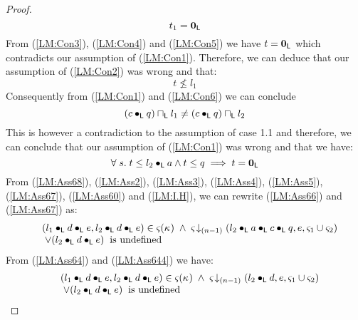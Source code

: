 \begin{lemma}[]
\begin{proof}
\begin{equation}
	t_1 = \mathbf{0}_{\textsf{L}} \label{LM:Con5}
\end{equation}
% 
From (\ref{LM:Con3}), (\ref{LM:Con4}) and (\ref{LM:Con5}) we have $t = \mathbf{0}_{\textsf{L}}$ which contradicts our assumption of (\ref{LM:Con1}). Therefore, we can deduce that our assumption of (\ref{LM:Con2}) was wrong and that:
%
\begin{equation}
	t \not\leq l_1 \label{LM:Con6}
\end{equation}
%
Consequently from (\ref{LM:Con1}) and (\ref{LM:Con6}) we can conclude
%
\begin{equation}
	(c \bullet_{\textsf{L}} q) \sqcap_{\textsf{L}} l_1 \not= (c \bullet_{\textsf{L}} q) \sqcap_{\textsf{L}} l_2 \nonumber
\end{equation}
%
This is however a contradiction to the assumption of case 1.1 and therefore, we can conclude that our assumption of (\ref{LM:Con1}) was wrong and that we have:
%
\begin{equation}
	\forall\; s.\; t\leq l_2 \bullet_{\textsf{L}} a \land t \leq  q \implies t = \mathbf{0}_{\textsf{L}} \label{LM:Ass60}
\end{equation}
%
From (\ref{LM:Ass68}), (\ref{LM:Ass2}), (\ref{LM:Ass3}), (\ref{LM:Ass4}), (\ref{LM:Ass5}), (\ref{LM:Ass67}), (\ref{LM:Ass60}) and (\ref{LM:I.H}), we can rewrite (\ref{LM:Ass66}) and (\ref{LM:Ass67}) as:
%
\begin{align}
	\begin{array}{l l}
		& (l_1 \bullet_{\textsf{L}} d \bullet_{\textsf{L}} e, l_2 \bullet_{\textsf{L}} d \bullet_{\textsf{L}} e) \in \varsigma_{}(\kappa_{}) \;\land\;
		\varsigma_{} \!\downarrow_{(n-1)} \left(l_2 \bullet_{\textsf{L}} a \bullet_{\textsf{L}} c \bullet_{\textsf{L}} q, e, \varsigma_{1} \cup \varsigma_{2}\right)\\
		& \;\lor (l_2 \bullet_{\textsf{L}} d \bullet_{\textsf{L}} e)\hspace*{0.2cm}\text{is undefined}
	\end{array} \label{LM:Ass69}
\end{align}
From (\ref{LM:Ass64}) and (\ref{LM:Ass644}) we have: 
%
\begin{align}
	\begin{array}{l l}
		& (l_1 \bullet_{\textsf{L}} d \bullet_{\textsf{L}} e, l_2 \bullet_{\textsf{L}} d \bullet_{\textsf{L}} e) \in \varsigma_{}(\kappa_{}) \;\land\;
		\varsigma_{} \!\downarrow_{(n-1)} \left(l_2 \bullet_{\textsf{L}} d, e, \varsigma_{1} \cup \varsigma_{2}\right)\\
		& \;\lor (l_2 \bullet_{\textsf{L}} d \bullet_{\textsf{L}} e)\hspace*{0.2cm}\text{is undefined}
	\end{array} \nonumber
\end{align}
%
%
%


\end{proof}
\end{lemma}
